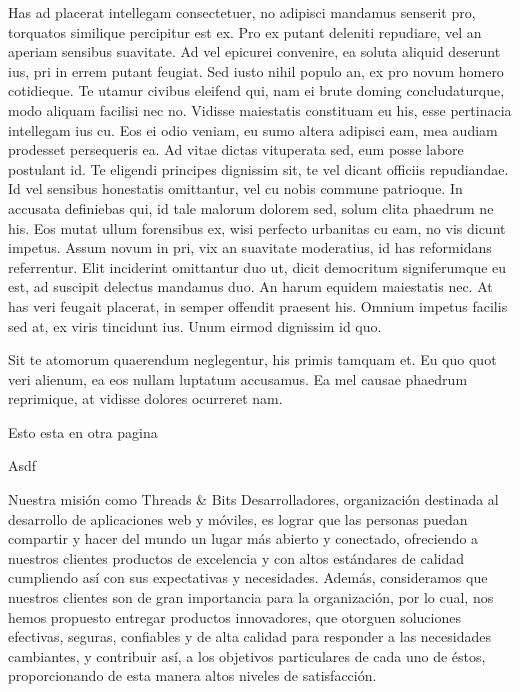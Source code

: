 \documentclass{memoria}
\begin{document}
Has ad placerat intellegam consectetuer, no adipisci
mandamus senserit pro, torquatos similique percipitur est ex. Pro ex putant
deleniti repudiare, vel an aperiam sensibus suavitate. Ad vel epicurei
convenire, ea soluta aliquid deserunt ius, pri in errem putant feugiat. Sed
iusto nihil populo an, ex pro novum homero cotidieque. Te utamur civibus
eleifend qui, nam ei brute doming concludaturque, modo aliquam facilisi nec no.
Vidisse maiestatis constituam eu his, esse pertinacia intellegam ius cu. Eos ei
odio veniam, eu sumo altera adipisci eam, mea audiam prodesset persequeris ea.
Ad vitae dictas vituperata sed, eum posse labore postulant id. Te eligendi
principes dignissim sit, te vel dicant officiis repudiandae. Id vel sensibus
honestatis omittantur, vel cu nobis commune patrioque. In accusata definiebas
qui, id tale malorum dolorem sed, solum clita phaedrum ne his. Eos mutat ullum
forensibus ex, wisi perfecto urbanitas cu eam, no vis dicunt impetus. Assum
novum in pri, vix an suavitate moderatius, id has reformidans referrentur. Elit
inciderint omittantur duo ut, dicit democritum signiferumque eu est, ad suscipit
delectus mandamus duo. An harum equidem maiestatis nec. At has veri feugait
placerat, in semper offendit praesent his. Omnium impetus facilis sed at, ex
viris tincidunt ius. Unum eirmod dignissim id quo. 


Sit te atomorum quaerendum neglegentur, his primis tamquam et. Eu quo quot veri
alienum, ea eos nullam luptatum accusamus. Ea mel causae phaedrum reprimique, at
vidisse dolores ocurreret nam.  

\newpage
Esto esta en otra pagina

Asdf



Nuestra misión como Threads \& Bits Desarrolladores, organización destinada al desarrollo de aplicaciones web y móviles, es  lograr que las personas puedan compartir y hacer del mundo un lugar más abierto y conectado, ofreciendo a nuestros clientes productos de excelencia y con altos estándares de calidad cumpliendo así con sus expectativas y necesidades. Además, consideramos que nuestros clientes son de gran importancia para la organización, por lo cual, nos hemos propuesto entregar productos innovadores, que otorguen soluciones efectivas, seguras, confiables y de alta calidad para responder a las necesidades cambiantes, y contribuir así, a los objetivos particulares de cada uno de éstos, proporcionando de esta manera altos niveles de satisfacción.
\end{document}

